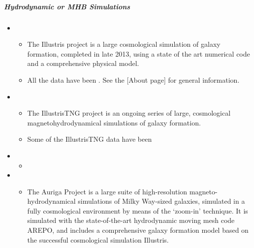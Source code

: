 \documentclass[letterpaper,10pt,english]{sphinxmanual}
\begin{document}
\subparagraph{Hydrodynamic or MHB Simulations}
\label{\detokenize{resource/astro/topics/simulations:hydrodynamic-or-mhb-simulations}}\begin{itemize}
\item {} 
\begin{itemize}
\item {} 
The Illustris project is a large cosmological simulation of galaxy
formation, completed in late 2013, using a state of the art
numerical code and a comprehensive physical model.

\item {} 
All the data have been . See the {[}About
page{]} for general information.

\end{itemize}

\item {} 
\begin{itemize}
\item {} 
The IllustrisTNG project is an ongoing series of large,
cosmological magnetohydrodynamical simulations of galaxy
formation.

\item {} 
Some of the IllustrisTNG data have been 

\end{itemize}

\item {} 
\begin{itemize}
\item {} 

\end{itemize}

\item {} 
\begin{itemize}
\item {} 
The Auriga Project is a large suite of high-resolution
magneto-hydrodynamical simulations of Milky Way-sized galaxies,
simulated in a fully cosmological environment by means of the
‘zoom-in’ technique. It is simulated with the state-of-the-art
hydrodynamic moving mesh code AREPO, and includes a comprehensive
galaxy formation model based on the successful cosmological
simulation Illustris.


\end{itemize}
\end{itemize}
\end{document}
